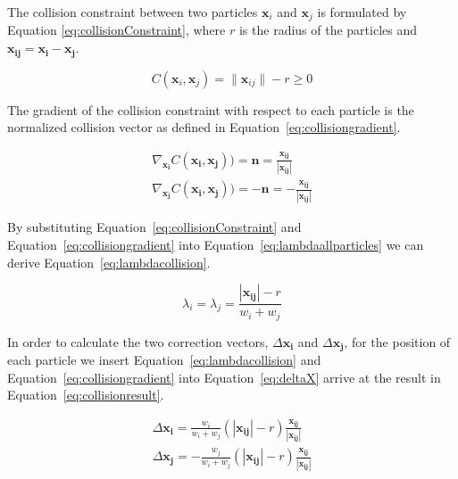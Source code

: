 The collision constraint between two particles $ \mathbf{x}_{i} $ and $
\mathbf{x}_{j} $ is formulated by Equation \ref{eq:collisionConstraint}, where
$ r $ is the radius of the particles and $ \mathbf{x_{ij}} = \mathbf{x_{i}} - \mathbf{x_{j}} $.

\begin{equation} \label{eq:collisionConstraint}
  C(\mathbf{x}_{i}, \mathbf{x}_{j}) = \| \mathbf{x}_{ij} \| - r \geq 0
\end{equation}

The gradient of the collision constraint with respect to each particle is the
normalized collision vector as defined in Equation~\ref{eq:collisiongradient}.

\begin{equation}
\label{eq:collisiongradient}
\begin{aligned}
\nabla_{\mathbf{x_{i}}} C(\mathbf{x_{i}}, \mathbf{x_{j}})) = \mathbf{n} = \frac{\mathbf{x_{ij}}}{\left | \mathbf{x_{ij}} \right |}
\\
\nabla_{\mathbf{x_{j}}} C(\mathbf{x_{i}}, \mathbf{x_{j}})) = - \mathbf{n} = - \frac{\mathbf{x_{ij}}}{\left | \mathbf{x_{ij}} \right |}
\end{aligned}
\end{equation}

By substituting Equation~\ref{eq:collisionConstraint} and
Equation~\ref{eq:collisiongradient} into Equation~\ref{eq:lambdaallparticles} we
can derive Equation~\ref{eq:lambdacollision}.

\begin{equation}
\label{eq:lambdacollision}
\lambda_{i} = \lambda_{j} = \frac{\left | \mathbf{x_{ij}} \right | - r}{w_{i} + w_{j}}
\end{equation}

In order to calculate the two correction vectors, $ \Delta \mathbf{x_{i}} $ and
$ \Delta \mathbf{x_{j}} $, for the position of each particle we insert
Equation~\ref{eq:lambdacollision} and Equation~\ref{eq:collisiongradient} into
Equation~\ref{eq:deltaX} arrive at the result in Equation~\ref{eq:collisionresult}.

\begin{equation}
\label{eq:collisionresult}
\begin{aligned}
\Delta \mathbf{x_{i}} = \frac{w_{i}}{w_{i} + w_{j}}(\left | \mathbf{x_{ij}} \right | - r) \frac{\mathbf{x_{ij}}}{\left | \mathbf{x_{ij}} \right |}
\\
\Delta \mathbf{x_{j}} = -\frac{w_{j}}{w_{i} + w_{j}}(\left | \mathbf{x_{ij}} \right | - r) \frac{\mathbf{x_{ij}}}{\left | \mathbf{x_{ij}} \right |}
\end{aligned}
\end{equation}
